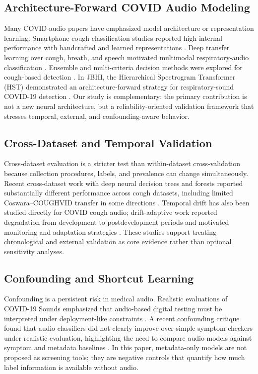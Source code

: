 \documentclass[journal]{IEEEtran}
\begin{document}
\subsection{Architecture-Forward COVID Audio Modeling}
Many COVID-audio papers have emphasized model architecture or representation learning. Smartphone cough classification studies reported high internal performance with handcrafted and learned representations \cite{pahar2021global}. Deep transfer learning over cough, breath, and speech motivated multimodal respiratory-audio classification \cite{pahar2022transfer}. Ensemble and multi-criteria decision methods were explored for cough-based detection \cite{chowdhury2022mcdm}. In JBHI, the Hierarchical Spectrogram Transformer (HST) demonstrated an architecture-forward strategy for respiratory-sound COVID-19 detection \cite{aytekin2024hst}. Our study is complementary: the primary contribution is not a new neural architecture, but a reliability-oriented validation framework that stresses temporal, external, and confounding-aware behavior.

\subsection{Cross-Dataset and Temporal Validation}
Cross-dataset evaluation is a stricter test than within-dataset cross-validation because collection procedures, labels, and prevalence can change simultaneously. Recent cross-dataset work with deep neural decision trees and forests reported substantially different performance across cough datasets, including limited Coswara--COUGHVID transfer in some directions \cite{islam2026dndf}. Temporal drift has also been studied directly for COVID cough audio; drift-adaptive work reported degradation from development to postdevelopment periods and motivated monitoring and adaptation strategies \cite{ganitidis2025drift}. These studies support treating chronological and external validation as core evidence rather than optional sensitivity analyses.

\subsection{Confounding and Shortcut Learning}
Confounding is a persistent risk in medical audio. Realistic evaluations of COVID-19 Sounds emphasized that audio-based digital testing must be interpreted under deployment-like constraints \cite{han2022sounds}. A recent confounding critique found that audio classifiers did not clearly improve over simple symptom checkers under realistic evaluation, highlighting the need to compare audio models against symptom and metadata baselines \cite{coppock2024audio}. In this paper, metadata-only models are not proposed as screening tools; they are negative controls that quantify how much label information is available without audio.
\end{document}
